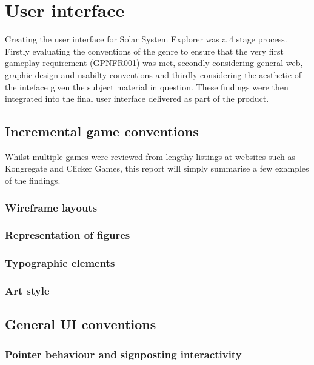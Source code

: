 \documentclass[twoside]{bhamthesis}
\begin{document}
\section{User interface}

Creating the user interface for Solar System Explorer was a 4 stage process. Firstly evaluating the conventions of the genre to ensure that the very first gameplay requirement (GPNFR001) was met, secondly considering general web, graphic design and usabilty conventions and thirdly considering the aesthetic of the inteface given the subject material in question. These findings were then integrated into the final user interface delivered as part of the product.

\subsection{Incremental game conventions}

Whilst multiple games were reviewed from lengthy listings at websites such as Kongregate and Clicker Games, this report will simply summarise a few examples of the findings.

\subsubsection{Wireframe layouts}

\subsubsection{Representation of figures}

\subsubsection{Typographic elements}

\subsubsection{Art style}

\subsection{General UI conventions}

\subsubsection{Pointer behaviour and signposting interactivity}
\end{document}
